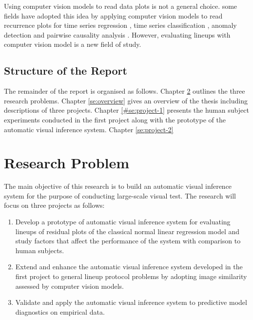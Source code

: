 \documentclass{monashthesis}
\theoremstyle{definition}
\theoremstyle{definition}
\theoremstyle{definition}
\theoremstyle{definition}
\theoremstyle{remark}
\begin{document}
Using computer vision models to read data plots is not a general choice. some fields have adopted this idea by applying computer vision models to read recurrence plots for time series regression \autocite{ojeda_multivariate_2020}, time series classification \autocite{chu_automatic_2019,hailesilassie_financial_2019,hatami_classification_2018,zhang_encoding_2020}, anomaly detection \autocite{chen_convolutional_2020} and pairwise causality analysis \autocite{singh_deep_2017}. However, evaluating lineups with computer vision model is a new field of study.

\hypertarget{structure-of-the-report}{%
\section{Structure of the Report}\label{structure-of-the-report}}

The remainder of the report is organised as follows. Chapter \ref{se:research-problem} outlines the three research problems. Chapter \ref{se:overview} gives an overview of the thesis including descriptions of three projects. Chapter \ref{#se:project-1} presents the human subject experiments conducted in the first project along with the prototype of the automatic visual inference system. Chapter \ref{se:project-2}

\hypertarget{se:research-problem}{%
\chapter{Research Problem}\label{se:research-problem}}

The main objective of this research is to build an automatic visual inference system for the purpose of conducting large-scale visual test. The research will focus on three projects as follows:

\begin{enumerate}
\def\labelenumi{\arabic{enumi}.}
\item
  Develop a prototype of automatic visual inference system for evaluating lineups of residual plots of the classical normal linear regression model and study factors that affect the performance of the system with comparison to human subjects.
\item
  Extend and enhance the automatic visual inference system developed in the first project to general lineup protocol problems by adopting image similarity assessed by computer vision models.
\item
  Validate and apply the automatic visual inference system to predictive model diagnostics on empirical data.
\end{enumerate}
\end{document}

